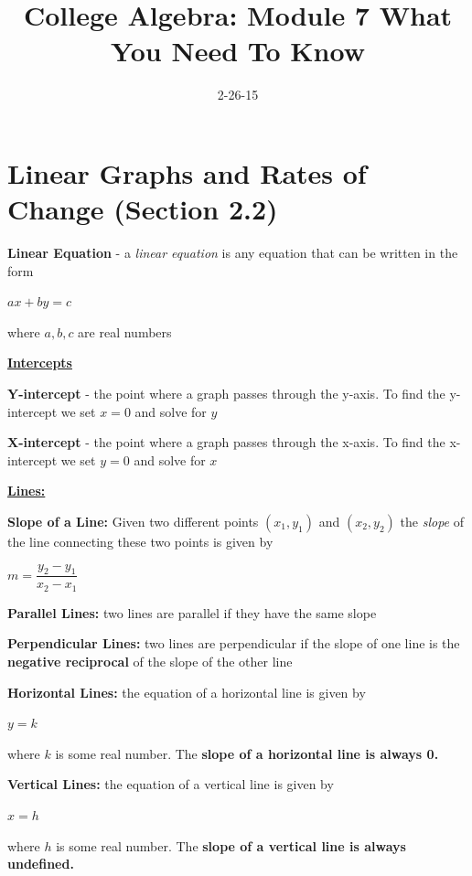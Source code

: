 \documentclass[12pt]{article}
\newenvironment{myindentpar}[1]%
     {\begin{list}{}%
             {\setlength{\leftmargin}{#1}}%
             \item[]%
     }
     {\end{list}}
\begin{document}
\title{College Algebra: Module 7 What You Need To Know}
\date{2-26-15}
\author{}
\maketitle


\section{Linear Graphs and Rates of Change (Section 2.2)}

\textbf{Linear Equation} - a \textit{linear equation} is any equation that can be written in the form
\newline

\centerline{$ax + by = c$}

where $a,b,c$ are real numbers 

{\bf \underline{Intercepts}}
\begin{myindentpar}{1cm}
\textbf{Y-intercept} - the point where a graph passes through the y-axis. To find the y-intercept we set $x=0$ and solve for $y$

\textbf{X-intercept} - the point where a graph passes through the x-axis. To find the x-intercept we set $y=0$ and solve for $x$
\end{myindentpar}

{\bf \underline{Lines:}}
\begin{myindentpar}{1cm}
\textbf{Slope of a Line: } Given two different points $(x_{1},y_{1})$ and $(x_{2}, y_{2})$ the \textit{slope} of the line connecting these two points is given by
\newline

\centerline{$m = \dfrac{y_{2} - y_{1}}{x_{2}-x_{1}}$}
\vspace{.5cm}

\textbf{Parallel Lines:} two lines are parallel if they have the same slope
\vspace{.5cm}

\textbf{Perpendicular Lines:} two lines are perpendicular if the slope of one line is the \textbf{negative reciprocal} of the slope of the other line

\vspace{.5cm}

\textbf{Horizontal Lines:} the equation of a horizontal line is given by
\newline

\centerline{$y = k$} 

where $k$ is some real number. The \textbf{slope of a horizontal line is always 0.}

\vspace{.5cm}

\textbf{Vertical Lines:} the equation of a vertical line is given by
\newline

\centerline{$x = h$} 

where $h$ is some real number. The \textbf{slope of a vertical line is always undefined.}
\end{myindentpar}
\end{document}
